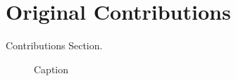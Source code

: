 \section{Original Contributions}
\label{sec:int_contributions}

Contributions Section.

\begin{figure}[H]
    \centering
    
    \caption{Caption}
    \label{fig:my_label}
\end{figure}
